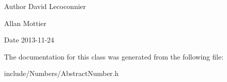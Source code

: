 \begin{DoxyAuthor}{Author}
David Lecoconnier 

Allan Mottier 
\end{DoxyAuthor}
\begin{DoxyDate}{Date}
2013-\/11-\/24 
\end{DoxyDate}


The documentation for this class was generated from the following file\-:\begin{DoxyCompactItemize}
\item 
include/\-Numbers/Abstract\-Number.\-h\end{DoxyCompactItemize}
